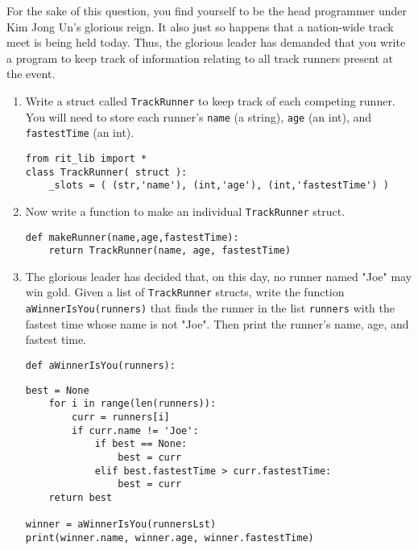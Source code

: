 For the sake of this question, you find yourself to be the head programmer under Kim Jong Un's glorious reign.
It also just so happens that a nation-wide track meet is being held today. Thus, the glorious leader has demanded that
you write a program to keep track of information relating to all track runners present at the event.

\begin{enumerate}
\item Write a struct called \texttt{TrackRunner} to keep track of each competing runner.
You will need to store each runner's \texttt{name} (a string), \texttt{age} (an int), and \texttt{fastestTime} (an int).
\begin{answer}
\begin{lstlisting}[numbers=none]
from rit_lib import *
class TrackRunner( struct ):
    _slots = ( (str,'name'), (int,'age'), (int,'fastestTime') )

\end{lstlisting}
\end{answer}

\item Now write a function to make an individual \texttt{TrackRunner} struct.
\begin{answer}
\begin{lstlisting}[numbers=none]
def makeRunner(name,age,fastestTime):
    return TrackRunner(name, age, fastestTime)
\end{lstlisting}
\end{answer}

\item The glorious leader has decided that, on this day, no runner named "Joe" may win
gold. Given a list of \texttt{TrackRunner} structs, write the function \texttt{aWinnerIsYou(runners)} that finds the runner in the list \texttt{runners} with the fastest time whose name is not "Joe".
Then print the runner's name, age, and fastest time.
\begin{lstlisting}[numbers=none]
def aWinnerIsYou(runners):
\end{lstlisting}
\begin{answer}
\begin{lstlisting}[numbers=none]
    best = None
    for i in range(len(runners)):
        curr = runners[i]
        if curr.name != 'Joe':
            if best == None:
                best = curr
            elif best.fastestTime > curr.fastestTime:
                best = curr
    return best

winner = aWinnerIsYou(runnersLst)
print(winner.name, winner.age, winner.fastestTime)
\end{lstlisting}
\end{answer}
\end{enumerate}

